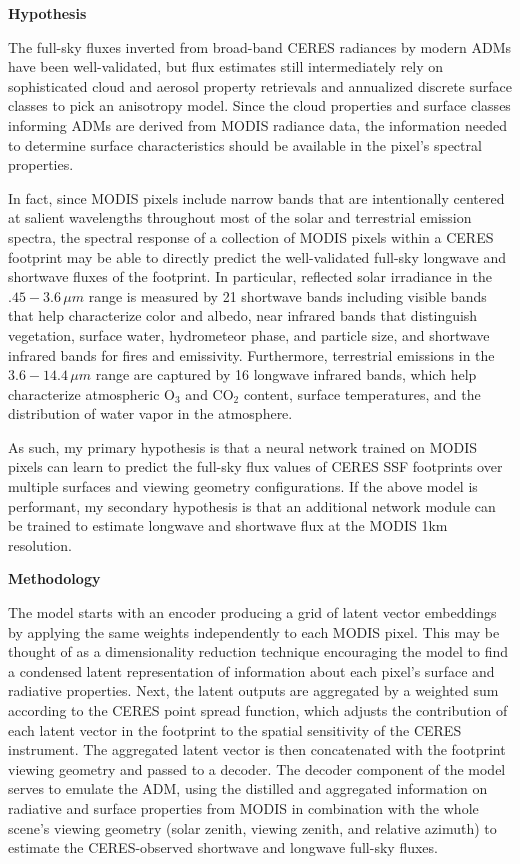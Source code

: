 \documentclass[11pt]{article}
\begin{document}
\noindent
{\large\textbf{Hypothesis}}

The full-sky fluxes inverted from broad-band CERES radiances by modern ADMs have been well-validated, but flux estimates still intermediately rely on sophisticated cloud and aerosol property retrievals and annualized discrete surface classes to pick an anisotropy model. Since the cloud properties and surface classes informing ADMs are derived from MODIS radiance data, the information needed to determine surface characteristics should be available in the pixel’s spectral properties.

In fact, since MODIS pixels include narrow bands that are intentionally centered at salient wavelengths throughout most of the solar and terrestrial emission spectra, the spectral response of a collection of MODIS pixels within a CERES footprint may be able to directly predict the well-validated full-sky longwave and shortwave fluxes of the footprint. In particular, reflected solar irradiance in the $.45-3.6\,\si{\mu m}$ range is measured by 21 shortwave bands including visible bands that help characterize color and albedo, near infrared bands that distinguish vegetation, surface water, hydrometeor phase, and particle size, and shortwave infrared bands for fires and emissivity. Furthermore, terrestrial emissions in the $3.6-14.4\,\si{\mu m}$ range are captured by 16 longwave infrared bands, which help characterize atmospheric O$_3$ and CO$_2$ content, surface temperatures, and the distribution of water vapor in the atmosphere.

As such, my primary hypothesis is that a neural network trained on MODIS pixels can learn to predict the full-sky flux values of CERES SSF footprints over multiple surfaces and viewing geometry configurations. If the above model is performant, my secondary hypothesis is that an additional network module can be trained to estimate longwave and shortwave flux at the MODIS 1km resolution.

\vspace{1em}

\noindent
{\large\textbf{Methodology}}

The model starts with an encoder producing a grid of latent vector embeddings by applying the same weights independently to each MODIS pixel. This may be thought of as a dimensionality reduction technique encouraging the model to find a condensed latent representation of information about each pixel's surface and radiative properties. Next, the latent outputs are aggregated by a weighted sum according to the CERES point spread function, which adjusts the contribution of each latent vector in the footprint to the spatial sensitivity of the CERES instrument. The aggregated latent vector is then concatenated with the footprint viewing geometry and passed to a decoder. The decoder component of the model serves to emulate the ADM, using the distilled and aggregated information on radiative and surface properties from MODIS in combination with the whole scene's viewing geometry (solar zenith, viewing zenith, and relative azimuth) to estimate the CERES-observed shortwave and longwave full-sky fluxes.
\end{document}

